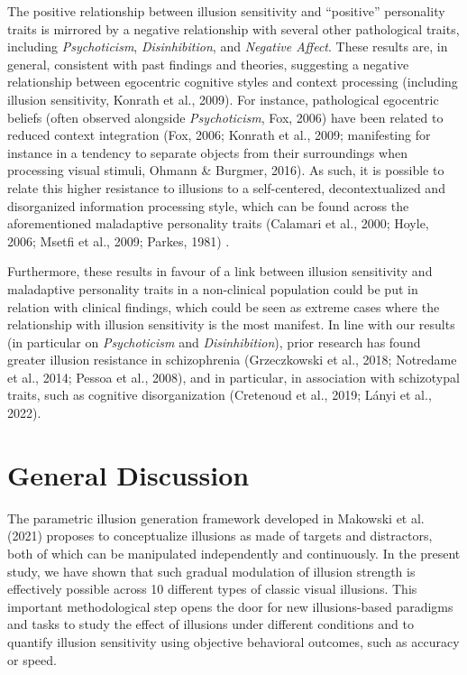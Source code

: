 \documentclass[
  man,floatsintext]{apa6}
\begin{document}
The positive relationship between illusion sensitivity and ``positive'' personality traits is mirrored by a negative relationship with several other pathological traits, including \emph{Psychoticism}, \emph{Disinhibition}, and \emph{Negative Affect}. These results are, in general, consistent with past findings and theories, suggesting a negative relationship between egocentric cognitive styles and context processing (including illusion sensitivity, Konrath et al., 2009). For instance, pathological egocentric beliefs (often observed alongside \emph{Psychoticism}, Fox, 2006) have been related to reduced context integration (Fox, 2006; Konrath et al., 2009; manifesting for instance in a tendency to separate objects from their surroundings when processing visual stimuli, Ohmann \& Burgmer, 2016). As such, it is possible to relate this higher resistance to illusions to a self-centered, decontextualized and disorganized information processing style, which can be found across the aforementioned maladaptive personality traits (Calamari et al., 2000; Hoyle, 2006; Msetfi et al., 2009; Parkes, 1981) .

Furthermore, these results in favour of a link between illusion sensitivity and maladaptive personality traits in a non-clinical population could be put in relation with clinical findings, which could be seen as extreme cases where the relationship with illusion sensitivity is the most manifest. In line with our results (in particular on \emph{Psychoticism} and \emph{Disinhibition}), prior research has found greater illusion resistance in schizophrenia (Grzeczkowski et al., 2018; Notredame et al., 2014; Pessoa et al., 2008), and in particular, in association with schizotypal traits, such as cognitive disorganization (Cretenoud et al., 2019; Lányi et al., 2022).

\hypertarget{general-discussion}{%
\section{General Discussion}\label{general-discussion}}

The parametric illusion generation framework developed in Makowski et al. (2021) proposes to conceptualize illusions as made of targets and distractors, both of which can be manipulated independently and continuously. In the present study, we have shown that such gradual modulation of illusion strength is effectively possible across 10 different types of classic visual illusions. This important methodological step opens the door for new illusions-based paradigms and tasks to study the effect of illusions under different conditions and to quantify illusion sensitivity using objective behavioral outcomes, such as accuracy or speed.
\end{document}
